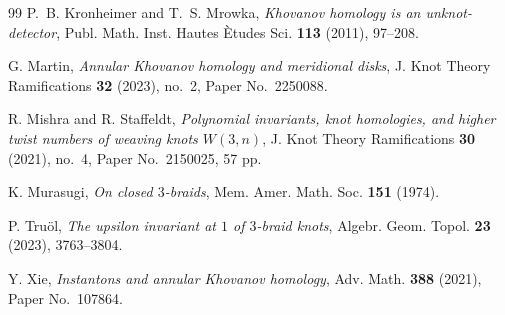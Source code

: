 \documentclass[11pt]{amsart}
\theoremstyle{remark}
\begin{document}
\begin{thebibliography}{99}
P.~B. Kronheimer and T.~S. Mrowka,
\emph{Khovanov homology is an unknot-detector},
Publ. Math. Inst. Hautes \`Etudes Sci. \textbf{113} (2011), 97--208.

G. Martin,
\emph{Annular Khovanov homology and meridional disks},
J. Knot Theory Ramifications \textbf{32} (2023), no.~2, Paper No.~2250088.

R. Mishra and R. Staffeldt,
\emph{Polynomial invariants, knot homologies, and higher twist numbers
of weaving knots \(W(3,n)\)},
J. Knot Theory Ramifications \textbf{30} (2021), no.~4,
Paper No.~2150025, 57 pp.

K. Murasugi,
\emph{On closed \(3\)-braids},
Mem. Amer. Math. Soc. \textbf{151} (1974).

P. Tru\"ol,
\emph{The upsilon invariant at \(1\) of \(3\)-braid knots},
Algebr. Geom. Topol. \textbf{23} (2023), 3763--3804.

Y. Xie,
\emph{Instantons and annular Khovanov homology},
Adv. Math. \textbf{388} (2021), Paper No.~107864.

\end{thebibliography}
\end{document}
